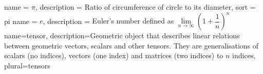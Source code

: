 {
	name = {\ensuremath{\pi}},
	description = {Ratio of circumference of circle to its
		diameter},
	sort = pi
}
{
	name = {\ensuremath{e}},
	description = {Euler's number defined as \ensuremath{\lim\limits_{n\to\infty} \left(1 + \dfrac{1}{n}\right)^{n}}}
}
{
	name={tensor},
	description={Geometric object that describes linear relations between geometric vectors, scalars and other tensors. They are generalisations of scalars (no indices), vectors (one index) and matrices (two indices) to $ n $ indices},
	plural=tensors
}
